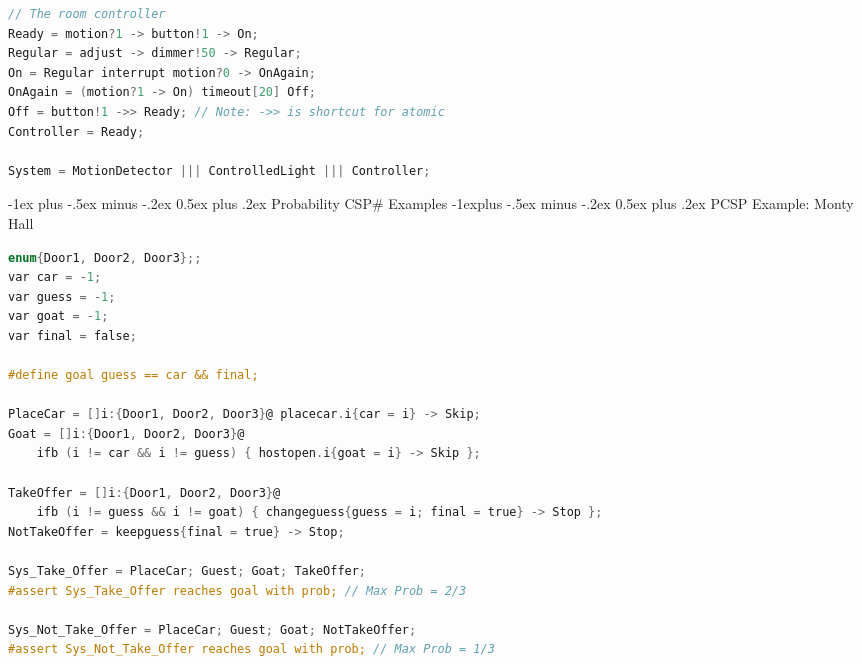 \documentclass[10pt, landscape]{article}
\makeatletter
\renewcommand{\section}{\@startsection{section}{1}{0mm}%
  {-1ex plus -.5ex minus -.2ex}%
  {0.5ex plus .2ex}%
{\normalfont\large\bfseries}}
\renewcommand{\subsection}{\@startsection{subsection}{2}{0mm}%
  {-1explus -.5ex minus -.2ex}%
  {0.5ex plus .2ex}%
{\normalfont\normalsize\bfseries}}
\makeatother
\begin{document}
\begin{multicols*}{2}
\begin{lstlisting}[language=C, basicstyle=\scriptsize\selectfont\ttfamily]
// The room controller
Ready = motion?1 -> button!1 -> On;
Regular = adjust -> dimmer!50 -> Regular;
On = Regular interrupt motion?0 -> OnAgain;
OnAgain = (motion?1 -> On) timeout[20] Off;
Off = button!1 ->> Ready; // Note: ->> is shortcut for atomic
Controller = Ready;

System = MotionDetector ||| ControlledLight ||| Controller;
\end{lstlisting}

  \newpage

  \section{Probability CSP\# Examples}
  \subsection{PCSP Example: Monty Hall}
\begin{lstlisting}[language=C, basicstyle=\scriptsize\selectfont\ttfamily, mathescape]
enum{Door1, Door2, Door3};;
var car = -1;
var guess = -1;
var goat = -1;
var final = false;

#define goal guess == car && final;

PlaceCar = []i:{Door1, Door2, Door3}@ placecar.i{car = i} -> Skip;
Goat = []i:{Door1, Door2, Door3}@ 
    ifb (i != car && i != guess) { hostopen.i{goat = i} -> Skip };

TakeOffer = []i:{Door1, Door2, Door3}@
    ifb (i != guess && i != goat) { changeguess{guess = i; final = true} -> Stop };
NotTakeOffer = keepguess{final = true} -> Stop;

Sys_Take_Offer = PlaceCar; Guest; Goat; TakeOffer;
#assert Sys_Take_Offer reaches goal with prob; // Max Prob = 2/3

Sys_Not_Take_Offer = PlaceCar; Guest; Goat; NotTakeOffer;
#assert Sys_Not_Take_Offer reaches goal with prob; // Max Prob = 1/3
\end{lstlisting}


\end{multicols*}
\end{document}
